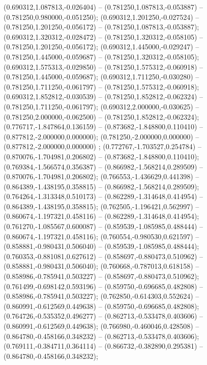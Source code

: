  (0.690312,1.087813,-0.026404) -- (0.781250,1.087813,-0.053887) -- (0.781250,0.980000,-0.051250);
 (0.690312,1.201250,-0.027524) -- (0.781250,1.201250,-0.056172) -- (0.781250,1.087813,-0.053887);
 (0.690312,1.320312,-0.028472) -- (0.781250,1.320312,-0.058105) -- (0.781250,1.201250,-0.056172);
 (0.690312,1.445000,-0.029247) -- (0.781250,1.445000,-0.059687) -- (0.781250,1.320312,-0.058105);
 (0.690312,1.575313,-0.029850) -- (0.781250,1.575312,-0.060918) -- (0.781250,1.445000,-0.059687);
 (0.690312,1.711250,-0.030280) -- (0.781250,1.711250,-0.061797) -- (0.781250,1.575312,-0.060918);
 (0.690312,1.852812,-0.030539) -- (0.781250,1.852812,-0.062324) -- (0.781250,1.711250,-0.061797);
 (0.690312,2.000000,-0.030625) -- (0.781250,2.000000,-0.062500) -- (0.781250,1.852812,-0.062324);
 (0.776717,-1.847864,0.136159) -- (0.873682,-1.848800,0.110410) -- (0.877812,-2.000000,0.000000);
 (0.781250,-2.000000,0.000000) -- (0.877812,-2.000000,0.000000) ;
 (0.772767,-1.703527,0.254784) -- (0.870076,-1.704981,0.206802) -- (0.873682,-1.848800,0.110410);
 (0.769384,-1.566574,0.356387) -- (0.866982,-1.568214,0.289509) -- (0.870076,-1.704981,0.206802);
 (0.766553,-1.436629,0.441398) -- (0.864389,-1.438195,0.358815) -- (0.866982,-1.568214,0.289509);
 (0.764264,-1.313348,0.510173) -- (0.862289,-1.314648,0.414954) -- (0.864389,-1.438195,0.358815);
 (0.762505,-1.196421,0.562997) -- (0.860674,-1.197321,0.458116) -- (0.862289,-1.314648,0.414954);
 (0.761270,-1.085567,0.600087) -- (0.859539,-1.085985,0.488444) -- (0.860674,-1.197321,0.458116);
 (0.760554,-0.980530,0.621597) -- (0.858881,-0.980431,0.506040) -- (0.859539,-1.085985,0.488444);
 (0.760353,-0.881081,0.627612) -- (0.858697,-0.880473,0.510962) -- (0.858881,-0.980431,0.506040);
 (0.760668,-0.787013,0.618158) -- (0.858986,-0.785941,0.503227) -- (0.858697,-0.880473,0.510962);
 (0.761499,-0.698142,0.593196) -- (0.859750,-0.696685,0.482808) -- (0.858986,-0.785941,0.503227);
 (0.762850,-0.614303,0.552624) -- (0.860991,-0.612569,0.449638) -- (0.859750,-0.696685,0.482808);
 (0.764726,-0.535352,0.496277) -- (0.862713,-0.533478,0.403606) -- (0.860991,-0.612569,0.449638);
 (0.766980,-0.460046,0.428508) -- (0.864780,-0.458166,0.348232) -- (0.862713,-0.533478,0.403606);
 (0.769111,-0.384711,0.364114) -- (0.866732,-0.382890,0.295381) -- (0.864780,-0.458166,0.348232);
